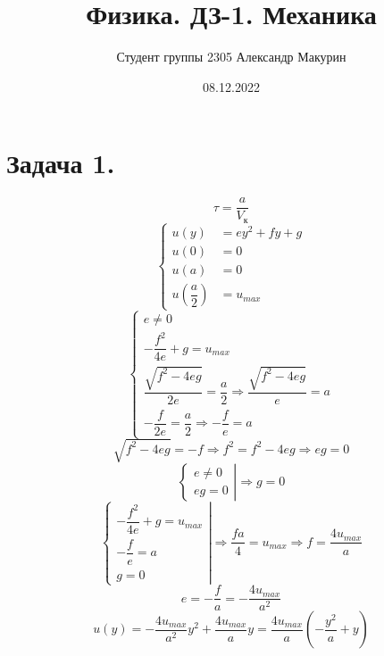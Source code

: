 \documentclass[12pt]{article}
\title{Физика. ДЗ-1. Механика}
\author{Студент группы 2305 Александр Макурин}
\date{08.12.2022}
\begin{document}
\maketitle

\begin{sloppypar}

    \section{Задача 1.}
    \[
        \tau = \dfrac{a}{V_к}
    \]
    \[
        \left\{\begin{array}{ll}
            u(y)            & = ey^2 + fy + g \\
            u(0)            & = 0             \\
            u(a)            & = 0             \\
            u(\dfrac{a}{2}) & = u_{max}
        \end{array}\right.
    \]
    \[
        \left\{\begin{array}{ll}
            e \neq 0                                                                                \\
            -\dfrac{f^2}{4e} + g = u_{max}                                                          \\
            \dfrac{\sqrt{f^2 - 4eg}}{2e} = \dfrac{a}{2} \Rightarrow \dfrac{\sqrt{f^2 - 4eg}}{e} = a \\
            -\dfrac{f}{2e} = \dfrac{a}{2} \Rightarrow -\dfrac{f}{e} = a
        \end{array}
        \right.
    \]
    \[
        \sqrt{f^2 - 4eg} = -f \Rightarrow f^2 = f^2 - 4eg \Rightarrow eg = 0
    \]
    \[
        \left\{\begin{array}{ll}
            e \neq 0 \\
            eg = 0
        \end{array}
        \right|
        \Rightarrow g = 0
    \]
    \[
        \left\{\begin{array}{ll}
            -\dfrac{f^2}{4e} + g = u_{max} \\
            -\dfrac{f}{e} = a              \\
            g = 0
        \end{array}\right|
        \Rightarrow \dfrac{fa}{4} = u_{max} \Rightarrow f = \dfrac{4u_{max}}{a}
    \]
    \[
        e = -\dfrac{f}{a} = -\dfrac{4u_{max}}{a^2}
    \]
    \[
        u(y) = -\dfrac{4u_{max}}{a^2}y^2 + \dfrac{4u_{max}}{a}y = \dfrac{4u_{max}}{a}(-\dfrac{y^2}{a} + y)
    \]


\end{sloppypar}
\end{document}
